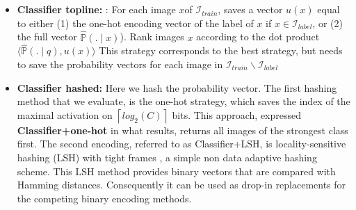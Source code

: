 \documentclass[conference]{IEEEtran}
\begin{document}
\\\\
\begin{itemize}

\item \textbf{Classifier topline: }: For each image $x$of $\mathcal{I}_{train}$, saves a vector $u(x)$ equal to either (1) the one-hot encoding vector of the label of $x$ if $x \in \mathcal{I}_{label}$, or (2) the full  vector  $\hat{\mathbb{P}}(.\mid x)$). Rank images $x$ according to the dot product $\langle\hat{\mathbb{P}}(.\mid q), u(x)\rangle$  This strategy corresponds to the best strategy, but needs to save the probability vectors for each image in $\mathcal{I}_{train} \backslash \mathcal{I}_{label}$


\item \textbf{Classifier hashed: } Here we hash the probability vector. The first hashing method that we evaluate, is the one-hot strategy, which saves the index of the maximal activation on $\left \lceil log_2(C) \right \rceil$ bits. This approach, expressed \textbf{Classifier+one-hot} in what results, returns all images of the strongest class first. The second encoding, referred to as Classifier+LSH, is locality-sensitive hashing (LSH) with tight frames \cite{jegou2012anti}, a simple non data adaptive hashing scheme. This LSH method provides binary vectors that are compared with Hamming distances. Consequently it can be used as drop-in replacements for the competing binary encoding methods.
\end{itemize}
\end{document}
